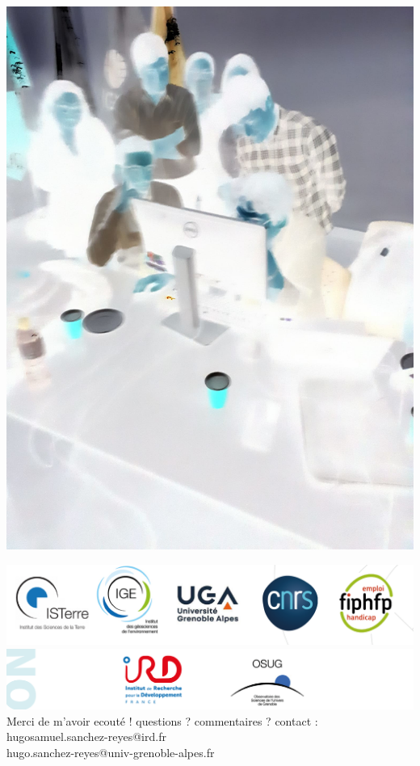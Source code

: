 \documentclass{beamer}
\begin{document}
\begin{frame}
\begin{minipage}{0.45\linewidth}
  \includegraphics[width=1\linewidth]{images/Lima2_neg.jpeg}   
 \end{minipage}
 
\end{frame}


\begin{frame}


 \centering 
   \includegraphics[width=1\linewidth]{../../logos/IRD-OSUG-ALL.png}   
   \includegraphics[width=1\linewidth]{../../logos/IRD-OSUG.png}   
 \vskip 0cm
 {\LARGE Merci de m'avoir ecouté !
 \vskip 0.7cm
 \LARGE questions ? commentaires ?
 }
 \vskip 1.1cm
 {\scriptsize \hskip 1.2cm contact : \\
              \hfill hugosamuel.sanchez-reyes@ird.fr \\
              \hfill hugo.sanchez-reyes@univ-grenoble-alpes.fr
 }
\end{frame}
\end{document}
